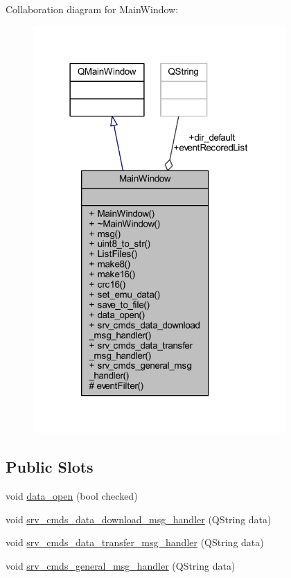 Collaboration diagram for Main\+Window\+:
\nopagebreak
\begin{figure}[H]
\begin{center}
\leavevmode
\includegraphics[width=273pt]{d4/d66/a00289}
\end{center}
\end{figure}
\subsection*{Public Slots}
\begin{DoxyCompactItemize}
\item 
void \hyperlink{a00006_a35b895072769864ac42f8cd732267e4b}{data\+\_\+open} (bool checked)
\item 
void \hyperlink{a00006_ac84167866950dd1eb9a29a5293546c1a}{srv\+\_\+cmds\+\_\+data\+\_\+download\+\_\+msg\+\_\+handler} (Q\+String data)
\item 
void \hyperlink{a00006_ae19ec21c1009c81700a8ad2e1f81be07}{srv\+\_\+cmds\+\_\+data\+\_\+transfer\+\_\+msg\+\_\+handler} (Q\+String data)
\item 
void \hyperlink{a00006_a8a8cd34488e8ee213350afb5b2261677}{srv\+\_\+cmds\+\_\+general\+\_\+msg\+\_\+handler} (Q\+String data)
\end{DoxyCompactItemize}
